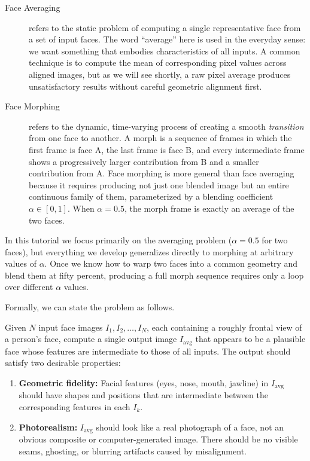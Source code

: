 \begin{description}
    \item[Face Averaging] refers to the static problem of computing a single representative face
    from a set of input faces. The word ``average'' here is used in the everyday sense: we want
    something that embodies characteristics of all inputs. A common technique is to compute the
    mean of corresponding pixel values across aligned images, but as we will see shortly, a raw
    pixel average produces unsatisfactory results without careful geometric alignment first.

    \item[Face Morphing] refers to the dynamic, time-varying process of creating a smooth
    \emph{transition} from one face to another. A morph is a sequence of frames in which the
    first frame is face A, the last frame is face B, and every intermediate frame shows a
    progressively larger contribution from B and a smaller contribution from A. Face morphing
    is more general than face averaging because it requires producing not just one blended image
    but an entire continuous family of them, parameterized by a blending coefficient $\alpha \in
    [0, 1]$. When $\alpha = 0.5$, the morph frame is exactly an average of the two faces.
\end{description}

In this tutorial we focus primarily on the averaging problem ($\alpha = 0.5$ for two faces), but
everything we develop generalizes directly to morphing at arbitrary values of $\alpha$. Once we
know how to warp two faces into a common geometry and blend them at fifty percent, producing a
full morph sequence requires only a loop over different $\alpha$ values.

Formally, we can state the problem as follows.

\begin{definition}
Given $N$ input face images $I_1, I_2, \dots, I_N$, each containing a roughly frontal view of a
person's face, compute a single output image $I_{\text{avg}}$ that appears to be a plausible face
whose features are intermediate to those of all inputs. The output should satisfy two desirable
properties:
\begin{enumerate}
    \item \textbf{Geometric fidelity:} Facial features (eyes, nose, mouth, jawline) in
    $I_{\text{avg}}$ should have shapes and positions that are intermediate between the
    corresponding features in each $I_k$.
    \item \textbf{Photorealism:} $I_{\text{avg}}$ should look like a real photograph of a face,
    not an obvious composite or computer-generated image. There should be no visible seams,
    ghosting, or blurring artifacts caused by misalignment.
\end{enumerate}
\end{definition}


